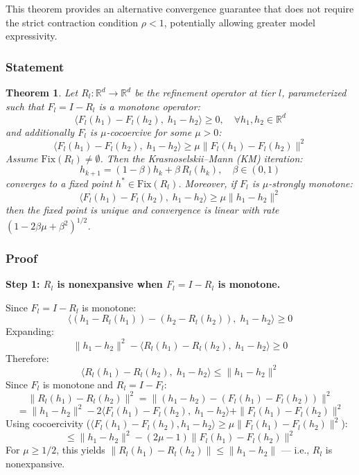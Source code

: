\documentclass[11pt,a4paper]{article}
\newtheorem{theorem}{Theorem}
\theoremstyle{definition}
\begin{document}
\vspace{0.5em}
This theorem provides an alternative convergence guarantee that does not require the strict contraction condition $\rho < 1$, potentially allowing greater model expressivity.

\subsubsection{Statement}

\begin{theorem}
Let $R_l : \mathbb{R}^d \to \mathbb{R}^d$ be the refinement operator at tier $l$, parameterized such that $F_l = I - R_l$ is a monotone operator:
\[ \langle F_l(h_1) - F_l(h_2), \; h_1 - h_2 \rangle \geq 0, \quad \forall h_1, h_2 \in \mathbb{R}^d \]
and additionally $F_l$ is $\mu$-cocoercive for some $\mu > 0$:
\[ \langle F_l(h_1) - F_l(h_2), \; h_1 - h_2 \rangle \geq \mu \|F_l(h_1) - F_l(h_2)\|^2 \]
Assume $\mathrm{Fix}(R_l) \neq \emptyset$. Then the Krasnoselskii--Mann (KM) iteration:
\[ h_{k+1} = (1 - \beta) h_k + \beta \, R_l(h_k), \quad \beta \in (0, 1) \]
converges to a fixed point $h^* \in \mathrm{Fix}(R_l)$. Moreover, if $F_l$ is $\mu$-strongly monotone:
\[ \langle F_l(h_1) - F_l(h_2), \; h_1 - h_2 \rangle \geq \mu \|h_1 - h_2\|^2 \]
then the fixed point is unique and convergence is linear with rate $(1 - 2\beta\mu + \beta^2)^{1/2}$.
\end{theorem}

\subsubsection{Proof}

\noindent\textbf{Step 1: $R_l$ is nonexpansive when $F_l = I - R_l$ is monotone.}

\noindent Since $F_l = I - R_l$ is monotone:
\[ \langle (h_1 - R_l(h_1)) - (h_2 - R_l(h_2)), \; h_1 - h_2 \rangle \geq 0 \]
Expanding:
\[ \|h_1 - h_2\|^2 - \langle R_l(h_1) - R_l(h_2), \; h_1 - h_2 \rangle \geq 0 \]
Therefore:
\[ \langle R_l(h_1) - R_l(h_2), \; h_1 - h_2 \rangle \leq \|h_1 - h_2\|^2 \]
Since $F_l$ is monotone and $R_l = I - F_l$:
\[ \|R_l(h_1) - R_l(h_2)\|^2 = \|(h_1 - h_2) - (F_l(h_1) - F_l(h_2))\|^2 \]
\[ = \|h_1 - h_2\|^2 - 2\langle F_l(h_1) - F_l(h_2), \; h_1 - h_2 \rangle + \|F_l(h_1) - F_l(h_2)\|^2 \]
Using cocoercivity ($\langle F_l(h_1) - F_l(h_2), h_1 - h_2 \rangle \geq \mu\|F_l(h_1) - F_l(h_2)\|^2$):
\[ \leq \|h_1 - h_2\|^2 - (2\mu - 1)\|F_l(h_1) - F_l(h_2)\|^2 \]
For $\mu \geq 1/2$, this yields $\|R_l(h_1) - R_l(h_2)\| \leq \|h_1 - h_2\|$ --- i.e., $R_l$ is nonexpansive.
\end{document}
